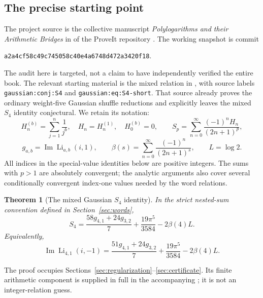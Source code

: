 \documentclass[11pt,letterpaper]{article}
\numberwithin{equation}{section}
\newtheorem{theorem}{Theorem}[section]
\theoremstyle{definition}
\DeclareMathOperator{\Li}{Li}
\DeclareMathOperator{\Imag}{Im}
\begin{document}
\subsection{The precise starting point}
The project source is the collective manuscript \emph{Polylogarithms and
their Arithmetic Bridges} in
 of the ProveIt repository
\cite{ProveIt}. The working snapshot is commit
\begin{center}
\small\texttt{a2a4cf58c49c745058c40e4a6748d472a3420f18}.
\end{center}
The audit here is targeted, not a claim to have independently verified the
entire book. The relevant starting material is the mixed relation in
, with source labels
\texttt{gaussian:conj:S4} and \texttt{gaussian:eq:S4-short}. That source already
proves the ordinary weight-five Gaussian shuffle reductions and explicitly
leaves the mixed $S_4$ identity conjectural. We retain its notation:
\begin{equation}
 H_n^{(b)}=\sum_{j=1}^n\frac1{j^b},\quad H_n=H_n^{(1)},\quad H_0^{(b)}=0,
 \qquad S_p=\sum_{n=0}^{\infty}\frac{(-1)^nH_n}{(2n+1)^p},
 \label{eq:Sp}
\end{equation}
\begin{equation}
 g_{a,b}=\Imag\Li_{a,b}(i,1),\qquad
 \beta(s)=\sum_{n=0}^{\infty}\frac{(-1)^n}{(2n+1)^s},\qquad L=\log2.
 \label{eq:notation}
\end{equation}
All indices in the special-value identities below are positive integers.
The sums with $p>1$ are absolutely convergent; the analytic arguments also
cover several conditionally convergent index-one values needed by the word
relations.

\begin{theorem}[The mixed Gaussian $S_4$ identity]\label{thm:S4}
In the strict nested-sum convention defined in Section~\ref{sec:words},
\begin{equation}
 \boxed{\displaystyle
 S_4=\frac{58g_{4,1}+24g_{3,2}}7+\frac{19\pi^5}{3584}
       -2\beta(4)L.}
 \label{eq:S4}
\end{equation}
Equivalently,
\begin{equation}
 \Imag\Li_{4,1}(i,-1)
 =\frac{51g_{4,1}+24g_{3,2}}7+\frac{19\pi^5}{3584}-2\beta(4)L.
 \label{eq:mixed41}
\end{equation}
\end{theorem}
The proof occupies Sections~\ref{sec:regularization}--\ref{sec:certificate}.
Its finite arithmetic component is supplied in full in the accompanying
; it is not an integer-relation guess.
\end{document}
